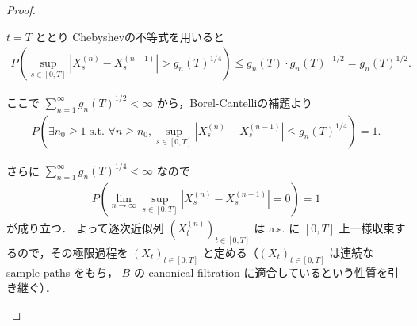 \documentclass{jsarticle}
\begin{document}
\begin{proof}
\begin{enumerate}[label=(\roman*)]
        $t=T$ ととり Chebyshevの不等式を用いると
        \begin{align}
            P(\sup_{s\in[0, T]}\left\lvert X_s^{(n)}-X_s^{(n-1)}\right\rvert>g_n(T)^{1/4})
            \le g_n(T)\cdot g_n(T)^{-1/2}
            = g_n(T)^{1/2}.
        \end{align}

        ここで $\sum_{n=1}^{\infty}g_n(T)^{1/2}<\infty$ から，Borel-Cantelliの補題より
        \begin{align}
            P(\exists n_0\ge1\text{ s.t. }\forall n\ge n_0, 
            \sup_{s\in[0, T]}\left\lvert X_s^{(n)}-X_s^{(n-1)}\right\rvert\le g_n(T)^{1/4}) = 1.
        \end{align}

        さらに $\sum_{n=1}^{\infty}g_n(T)^{1/4}<\infty$ なので
        \begin{align}
            P(\lim_{n\to\infty}\sup_{s\in[0, T]}\left\lvert X_s^{(n)}-X_s^{(n-1)}\right\rvert=0)=1
        \end{align}
        が成り立つ．
        よって逐次近似列 $(X_t^{(n)})_{t\in[0, T]}$ は a.s. に $[0, T]$ 上一様収束するので，その極限過程を $(X_t)_{t\in[0, T]}$ と定める（$(X_t)_{t\in[0, T]}$ は連続な sample paths をもち， $B$ の canonical filtration に適合しているという性質を引き継ぐ）．
    \end{enumerate}
\end{proof}
\end{document}
